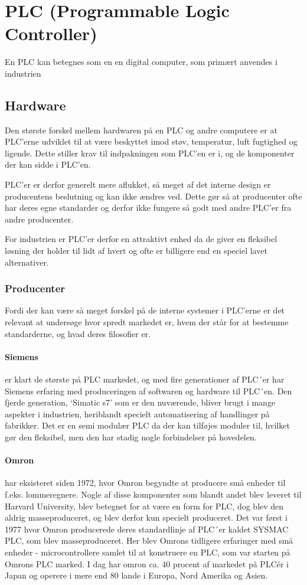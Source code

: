 \section{PLC (Programmable Logic Controller)}
En PLC kan betegnes som en en digital computer, som primært anvendes i industrien 


\subsection{Hardware}

Den største forskel mellem hardwaren på en PLC og andre computere er at PLC'erne udviklet til at være beskyttet imod støv, temperatur, luft fugtighed og ligende. Dette stiller krav til indpakningen som PLC'en er i, og de komponenter der kan sidde i PLC'en.

PLC'er er derfor generelt mere aflukket, så meget af det interne design er producentens beslutning og kan ikke ændres ved. Dette gør så at producenter ofte har deres egne standarder og derfor ikke fungere så godt med andre PLC'er fra andre producenter.

For industrien er PLC'er derfor en attraktivt enhed da de giver en fleksibel løsning der holder til lidt af hvert og ofte er billigere end en speciel lavet alternativer. 

\subsubsection{Producenter}
Fordi der kan være så meget forskel på de interne systemer i PLC'erne er det relevant at undersøge hvor spredt markedet er, hvem der står for at bestemme standarderne, og hvad deres filosofier er.

\paragraph{Siemens}
er klart de største på PLC markedet, og med fire generationer af PLC´er har Siemens erfaring med produceringen af softwaren og hardware til PLC´en. Den fjerde generation, \enquote*{Simatic s7} som er den nuværende, bliver brugt i mange aspekter i industrien, heriblandt specielt automatisering af handlinger på fabrikker. Det er en semi modulær PLC da der kan tilføjes moduler til, hvilket gør den fleksibel, men den har stadig nogle forbindelser på hovedelen.

\paragraph{Omron}
har eksisteret siden 1972, hvor Omron begyndte at producere små enheder til f.eks. lommeregnere. Nogle af disse komponenter som blandt andet blev leveret til Harvard University, blev betegnet for at være en form for PLC, dog blev den aldrig masseproduceret, og blev derfor kun specielt produceret. Det var først i 1977 hvor Omron producerede deres standardlinje af PLC´er kaldet SYSMAC PLC, som blev masseproduceret. Her blev Omrons tidligere erfaringer med små enheder - microcontrollere samlet til at konstruere en PLC, som var starten på Omrons PLC marked. I dag har omron ca. 40 procent af markedet på PLCér i Japan og operere i mere end 80 lande i Europa, Nord Amerika og Asien.

